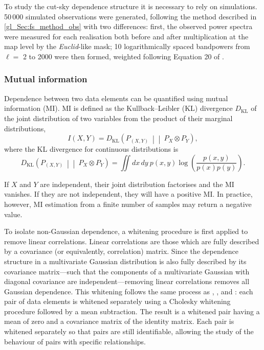 To study the cut-sky dependence structure it is necessary to rely on simulations. 50\,000 simulated observations were generated, following the method described in \autoref{gl_Sec:fs_method_obs} with two differences: first, the observed power spectra were measured for each realisation both before and after multiplication at the map level by the \textit{Euclid}-like mask; 10 logarithmically spaced bandpowers from $\ell =$ 2 to 2000 were then formed, weighted following Equation 20 of \citet{Hivon2002}.

\subsubsection{Mutual information}

Dependence between two data elements can be quantified using mutual information (MI). MI is defined as the Kullback--Leibler (KL) divergence $D_\text{KL}$ of the joint distribution of two variables from the product of their marginal distributions,
\begin{equation}
I \left( X, Y \right)
= D_\text{KL} \left( P_{\left( X, Y \right)} ~\middle| \middle|~
P_X \otimes P_Y \right),
\end{equation}
where the KL divergence for continuous distributions is
\begin{equation}
D_\text{KL} \left( P_{\left( X, Y \right)} ~\middle| \middle|~
P_X \otimes P_Y \right)
= \iint dx\,dy ~ p \left( x, y \right)
\log \left( \frac{ p \left(x, y \right) }
{p \left(x \right) p \left( y \right)} \right).
\label{gl_Eqn:kl_div}
\end{equation}

If $X$ and $Y$ are independent, their joint distribution factorises and the MI vanishes. If they are not independent, they will have a positive MI. In practice, however, MI estimation from a finite number of samples may return a negative value.

To isolate non-Gaussian dependence, a whitening procedure is first applied to remove linear correlations. Linear correlations are those which are fully described by a covariance (or equivalently, correlation) matrix. Since the dependence structure in a multivariate Gaussian distribution is also fully described by its covariance matrix---such that the components of a multivariate Gaussian with diagonal covariance are independent---removing linear correlations removes all Gaussian dependence.
This whitening follows the same process as \citet{Sellentin2018}, \citet{Sellentin2018a}, \citet{DiazRivero2020} and \citet{Louca2020}: each pair of data elements is whitened separately using a Cholesky whitening procedure followed by a mean subtraction. The result is a whitened pair having a mean of zero and a covariance matrix of the identity matrix. Each pair is whitened separately so that pairs are still identifiable, allowing the study of the behaviour of pairs with specific relationships.

